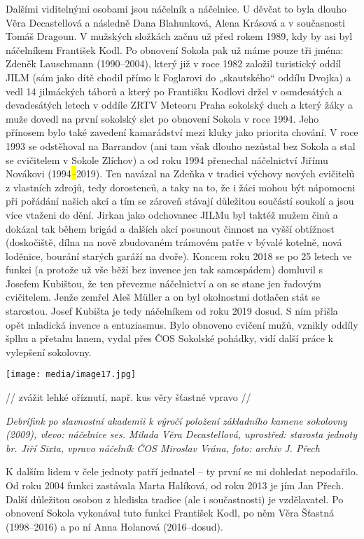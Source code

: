 Dalšími viditelnými osobami jsou náčelník a náčelnice. U děvčat to byla
dlouho Věra Decastellová a následně Dana Blahunková, Alena Krásová a v
současnosti Tomáš Dragoun. V mužských složkách začnu už před rokem 1989,
kdy by asi byl náčelníkem František Kodl. Po obnovení Sokola pak už máme
pouze tři jména: Zdeněk Lauschmann (1990--2004), který již v roce 1982
založil turistický oddíl JILM (sám jako dítě chodil přímo k Foglarovi do
„skautského`` oddílu Dvojka) a vedl 14 jilmáckých táborů a který po
Františku Kodlovi držel v osmdesátých a devadesátých letech v oddíle
ZRTV Meteoru Praha sokolský duch a který žáky a muže dovedl na první
sokolský slet po obnovení Sokola v roce 1994. Jeho přínosem bylo také
zavedení kamarádství mezi kluky jako priorita chování. V roce 1993 se
odstěhoval na Barrandov (ani tam však dlouho nezůstal bez Sokola a stal
se cvičitelem v Sokole Zlíchov) a od roku 1994 přenechal náčelnictví
Jiřímu Novákovi (1994\emph{\hl{--}}2019). Ten navázal na Zdeňka v
tradici výchovy nových cvičitelů z vlastních zdrojů, tedy dorostenců, a
taky na to, že i žáci mohou být nápomocni při pořádání našich akcí a tím
se zároveň stávají důležitou součástí soukolí a jsou více vtaženi do
dění. Jirkan jako odchovanec JILMu byl taktéž mužem činů a dokázal tak
během brigád a dalších akcí posunout činnost na vyšší obtížnost
(doskočiště, dílna na nově zbudovaném trámovém patře v bývalé kotelně,
nová loděnice, bourání starých garáží na dvoře). Koncem roku 2018 se po
25 letech ve funkci (a protože už vše běží bez invence jen tak
samospádem) domluvil s Josefem Kubištou, že ten převezme náčelnictví a
on se stane jen řadovým cvičitelem. Jenže zemřel Aleš Müller a on byl
okolnostmi dotlačen stát se starostou. Josef Kubišta je tedy náčelníkem
od roku 2019 dosud. S ním přišla opět mladická invence a entuziasmus.
Bylo obnoveno cvičení mužů, vznikly oddíly šplhu a přetahu lanem, vydal
přes ČOS Sokolské pohádky, vidí další práce k vylepšení sokolovny.

\texttt{[image: media/image17.jpg]}

// zvážit lehké oříznutí, např. kus věry šťastné vpravo //

\emph{Debrífink po slavnostní akademii k výročí položení základního
kamene sokolovny (2009), vlevo: náčelnice ses. Milada Věra Decastellová,
uprostřed: starosta jednoty br. Jiří Sixta, vpravo náčelník ČOS Miroslav
Vrána, foto: archiv J. Přech}

K dalším lidem v čele jednoty patří jednatel -- ty první se mi dohledat
nepodařilo. Od roku 2004 funkci zastávala Marta Halíková, od roku 2013
je jím Jan Přech. Další důležitou osobou z hlediska tradice (ale i
součastnosti) je vzdělavatel. Po obnovení Sokola vykonával tuto funkci
František Kodl, po něm Věra Šťastná (1998--2016) a po ní Anna Holanová
(2016--dosud).

